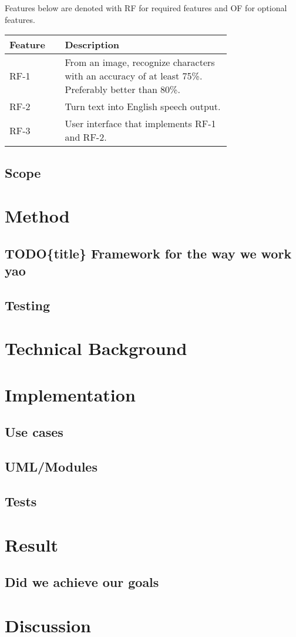 \documentclass[a4paper, english]{scrartcl}
\begin{document}
Features below are denoted with RF for required features and OF for optional
features.
  \noindent\begin{tabularx}{\linewidth}{X p{0.75\linewidth}}
  \toprule
    \textbf{Feature} & \textbf{Description} \\
  \midrule
  RF-1 &
    From an image, recognize characters with an accuracy of at least 75\%. Preferably better than 80\%. \\
  RF-2 &
    Turn text into English speech output. \\
  RF-3 &
    User interface that implements RF-1 and RF-2. \\
  \bottomrule
  \end{tabularx}
\subsection{Scope}

\section{Method}
\subsection{TODO\{title\} Framework for the way we work yao}
\subsection{Testing}

\section{Technical Background}

\section{Implementation}
\subsection{Use cases}
\subsection{UML/Modules}
\subsection{Tests}

\section{Result}
\subsection{Did we achieve our goals}

\section{Discussion}

\pagebreak


\end{document}
